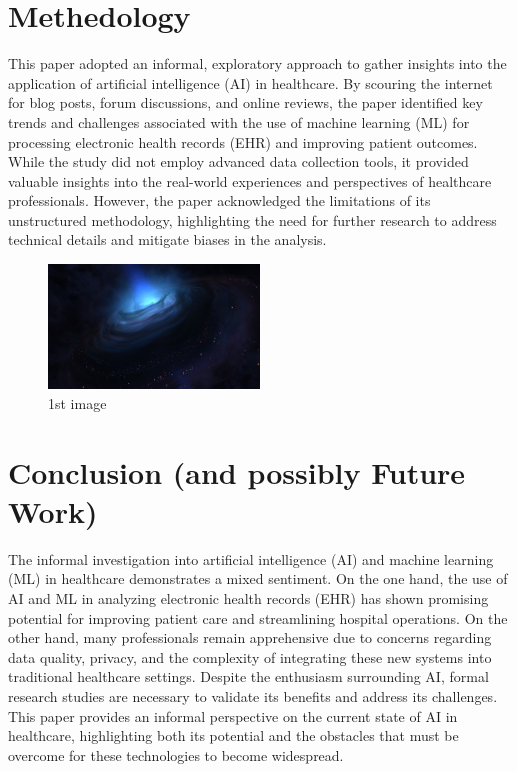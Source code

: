 \documentclass[conference]{IEEEtran}
\begin{document}
  

  

  
    \section{Methedology}
    This paper adopted an informal, exploratory approach to gather insights into the application of artificial intelligence (AI) in healthcare. By scouring the internet for blog posts, forum discussions, and online reviews, the paper identified key trends and challenges associated with the use of machine learning (ML) for processing electronic health records (EHR) and improving patient outcomes. While the study did not employ advanced data collection tools, it provided valuable insights into the real-world experiences and perspectives of healthcare professionals. However, the paper acknowledged the limitations of its unstructured methodology, highlighting the need for further research to address technical details and mitigate biases in the analysis.

\begin{figure}[h]
\centering
\includegraphics[width=0.5\textwidth]{..//uploads/1740581299422.jpg}
\caption{1st image}
\end{figure}
    
  

  

  
    \section{Conclusion (and possibly Future Work)}
    The informal investigation into artificial intelligence (AI) and machine learning (ML) in healthcare demonstrates a mixed sentiment. On the one hand, the use of AI and ML in analyzing electronic health records (EHR) has shown promising potential for improving patient care and streamlining hospital operations. On the other hand, many professionals remain apprehensive due to concerns regarding data quality, privacy, and the complexity of integrating these new systems into traditional healthcare settings. Despite the enthusiasm surrounding AI, formal research studies are necessary to validate its benefits and address its challenges. This paper provides an informal perspective on the current state of AI in healthcare, highlighting both its potential and the obstacles that must be overcome for these technologies to become widespread.
\end{document}
